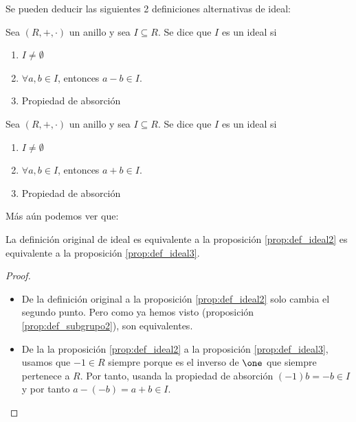 Se pueden deducir las siguientes 2 definiciones alternativas de ideal:

\begin{prop}\label{prop:def_ideal2}
	Sea $(R,+,\cdot)$ un anillo y sea $I \subseteq R$. Se dice que $I$ es un ideal si

	\begin{enumerate}
		\item $I \neq \emptyset$
		\item $\forall a,b \in I$, entonces $a-b \in I$.
		\item Propiedad de absorción
	\end{enumerate}
\end{prop}
\begin{prop}\label{prop:def_ideal3}
	Sea $(R,+,\cdot)$ un anillo y sea $I \subseteq R$. Se dice que $I$ es un ideal si

	\begin{enumerate}
		\item $I \neq \emptyset$
		\item $\forall a,b \in I$, entonces $a+b \in I$.
		\item Propiedad de absorción
	\end{enumerate}
\end{prop}


Más aún podemos ver que:
\begin{prop}
	La definición original de ideal es equivalente a
	la proposición \ref{prop:def_ideal2} es equivalente a la proposición \ref{prop:def_ideal3}.
\end{prop}
\begin{proof}
	\begin{itemize}
		\item De la definición original a la proposición \ref{prop:def_ideal2} solo cambia el segundo punto. Pero como ya hemos visto (proposición \ref{prop:def_subgrupo2}), son equivalentes.
		\item De la la proposición \ref{prop:def_ideal2} a la proposición \ref{prop:def_ideal3}, usamos que $-1 \in R$ siempre porque es el inverso de $\one$ que siempre pertenece a $R$. Por tanto, usanda la propiedad de absorción $(-1)b=-b \in I$ y por tanto $a-(-b)=a+b \in I$.
	\end{itemize}
\end{proof}


